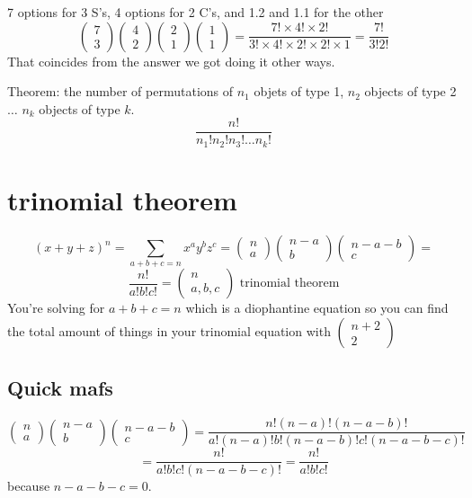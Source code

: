 \documentclass{report}
\begin{document}
7 options for 3 S's, 4 options for 2 C's, and 1.2 and 1.1 for the other
\[
\begin{pmatrix}7 \\ 3 \end{pmatrix}
\begin{pmatrix}4 \\ 2 \end{pmatrix}
\begin{pmatrix}2 \\ 1 \end{pmatrix}
\begin{pmatrix}1 \\ 1 \end{pmatrix}
=
\frac{7! \times 4! \times 2!}
{
3! \times 4! \times 2! \times 2! \times 1
}
=
\frac{
7!}
{
3! 2!}
\]
That coincides from the answer we got doing it other ways.

Theorem: the number of permutations of $n_1$ objets of type 1, $n_2$ objects of type 2 $\ldots$ $n_k$ objects of type $k$.
\[
\frac{n!}
{
n_1! n_2! n_3! \ldots n_k!
}
\]


\section{trinomial theorem}
\[
(x+y+z)^n = \sum_{a+b+c=n}x^ay^bz^c
=
\begin{pmatrix}n \\ a \end{pmatrix}
\begin{pmatrix}n-a \\ b \end{pmatrix}
\begin{pmatrix}n-a-b \\ c \end{pmatrix}
=
\]
\[
\frac{n!}{a! b! c!}
=
\begin{pmatrix}n \\ a,b,c \end{pmatrix}
\textrm{ trinomial theorem}
\]
You're solving for $a + b + c = n$ which is a diophantine equation so you can find the total amount of things in your trinomial equation with $\begin{pmatrix}n+2 \\ 2 \end{pmatrix}$

\subsection*{Quick mafs}
\[
\begin{pmatrix}n \\ a \end{pmatrix}
\begin{pmatrix}n-a \\ b \end{pmatrix}
\begin{pmatrix}n-a-b \\ c \end{pmatrix}
=
\frac{n!(n-a)!(n-a-b)!}
{
a!(n-a)!b!(n-a-b)!c!(n-a-b-c)!
}
\]
\[
=
\frac{n!}
{
a!b!c!(n-a-b-c)!}
=
\frac{n!}
{
a!b!c!}
\]
because $n-a-b-c=0$.
\end{document}
